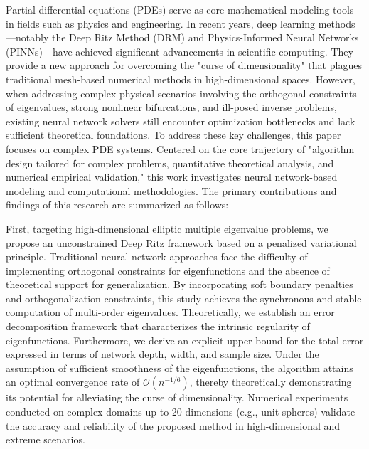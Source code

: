 



\begin{enabstract}
Partial differential equations (PDEs) serve as core mathematical modeling tools in fields such as physics and engineering. In recent years, deep learning methods—notably the Deep Ritz Method (DRM) and Physics-Informed Neural Networks (PINNs)—have achieved significant advancements in scientific computing. They provide a new approach for overcoming the "curse of dimensionality" that plagues traditional mesh-based numerical methods in high-dimensional spaces. However, when addressing complex physical scenarios involving the orthogonal constraints of eigenvalues, strong nonlinear bifurcations, and ill-posed inverse problems, existing neural network solvers still encounter optimization bottlenecks and lack sufficient theoretical foundations. To address these key challenges, this paper focuses on complex PDE systems. Centered on the core trajectory of "algorithm design tailored for complex problems, quantitative theoretical analysis, and numerical empirical validation," this work investigates neural network-based modeling and computational methodologies. The primary contributions and findings of this research are summarized as follows:

First, targeting high-dimensional elliptic multiple eigenvalue problems, we propose an unconstrained Deep Ritz framework based on a penalized variational principle. Traditional neural network approaches face the difficulty of implementing orthogonal constraints for eigenfunctions and the absence of theoretical support for generalization. By incorporating soft boundary penalties and orthogonalization constraints, this study achieves the synchronous and stable computation of multi-order eigenvalues. Theoretically, we establish an error decomposition framework that characterizes the intrinsic regularity of eigenfunctions. Furthermore, we derive an explicit upper bound for the total error expressed in terms of network depth, width, and sample size. Under the assumption of sufficient smoothness of the eigenfunctions, the algorithm attains an optimal convergence rate of $\mathcal{O}(n^{-1/6})$, thereby theoretically demonstrating its potential for alleviating the curse of dimensionality. Numerical experiments conducted on complex domains up to 20 dimensions (e.g., unit spheres) validate the accuracy and reliability of the proposed method in high-dimensional and extreme scenarios.


\end{enabstract}
